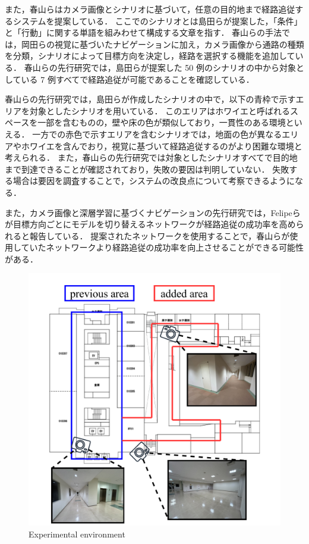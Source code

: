 また，春山ら\cite{haruyama2023}はカメラ画像とシナリオに基づいて，任意の目的地まで経路追従するシステムを提案している．
ここでのシナリオとは島田ら\cite{shimada2020}が提案した，「条件」と「行動」に関する単語を組みわせて構成する文章を指す．
春山らの手法では，岡田らの視覚に基づいたナビゲーションに加え，カメラ画像から通路の種類を分類，シナリオによって目標方向を決定し，経路を選択する機能を追加している．
春山らの先行研究では，島田らが提案した 50 例のシナリオの中から対象としている 7 例すべてで経路追従が可能であることを確認している．

春山らの先行研究では，島田らが作成したシナリオの中で，以下の青枠で示すエリアを対象としたシナリオを用いている．
このエリアはホワイエと呼ばれるスペースを一部を含むものの，壁や床の色が類似しており，一貫性のある環境といえる．
一方での赤色で示すエリアを含むシナリオでは，地面の色が異なるエリアやホワイエを含んでおり，視覚に基づいて経路追従するのがより困難な環境と考えられる．
また，春山らの先行研究では対象としたシナリオすべてで目的地まで到達できることが確認されており，失敗の要因は判明していない．
失敗する場合は要因を調査することで，システムの改良点について考察できるようになる．

また，カメラ画像と深層学習に基づくナビゲーションの先行研究では，Felipeらが目標方向ごとにモデルを切り替えるネットワークが経路追従の成功率を高められると報告している．
提案されたネットワークを使用することで，春山らが使用していたネットワークより経路追従の成功率を向上させることができる可能性がある．

\begin{figure}[htbp]
     \centering
     \includegraphics[width=130mm]{images/pdf/ishiguro/cit3f.pdf}
     \caption{Experimental environment}
     \label{fig:cit3f}
\end{figure}

\newpage
